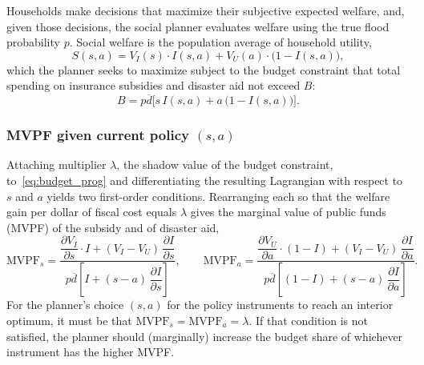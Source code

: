 \documentclass[12pt]{article}
\begin{document}
Households make decisions that maximize their subjective expected welfare, and, given those decisions, the social planner evaluates welfare using the true flood probability $p$. Social welfare is the population average of household utility,
\begin{equation}
    S(s,a) = V_I(s)\cdot I(s,a) + V_U(a)\cdot\bigl(1-I(s,a)\bigr), \label{eq:welfare_prog}
\end{equation}
which the planner seeks to maximize subject to the budget constraint that total spending on insurance subsidies and disaster aid not exceed $B$:
\begin{equation}
    B = p\overline{d}\bigl[s\,I(s,a) + a\,\bigl(1-I(s,a)\bigr)\bigr]. \label{eq:budget_prog}
\end{equation}

\subsubsection{MVPF given current policy \texorpdfstring{$(s,a)$}{(s,a)}}

Attaching multiplier $\lambda$, the shadow value of the budget constraint, to~\eqref{eq:budget_prog} and differentiating the resulting Lagrangian with respect to $s$ and $a$ yields two first-order conditions. Rearranging each so that the welfare gain per dollar of fiscal cost equals $\lambda$ gives the marginal value of public funds (MVPF) of the subsidy and of disaster aid,
\begin{equation}
    \text{MVPF}_s = \frac{
        \dfrac{\partial V_I}{\partial s}\cdot I
         +  (V_I-V_U)\,\dfrac{\partial I}{\partial s}
    }{
        p\overline{d}\!\left[I + (s-a)\,\dfrac{\partial I}{\partial s}\right]
    }, \qquad
    \text{MVPF}_a = \frac{
        \dfrac{\partial V_U}{\partial a}\cdot(1-I)
         + (V_I-V_U)\,\dfrac{\partial I}{\partial a}
    }{
        p\overline{d}\!\left[(1-I) + (s-a)\,\dfrac{\partial I}{\partial a}\right]
    }. \label{eq:mvpf_prog}
\end{equation}
For the planner's choice $(s,a)$ for the policy instruments to reach an interior optimum, it must be that $\text{MVPF}_s = \text{MVPF}_a = \lambda$. If that condition is not satisfied, the planner should (marginally) increase the budget share of whichever instrument has the higher MVPF.
\end{document}
